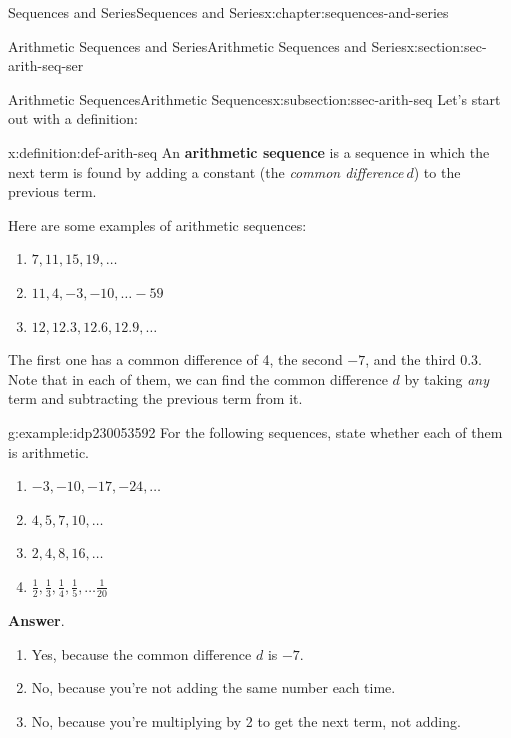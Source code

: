 \documentclass[twoside,10pt,]{book}
\newcommand{\blocktitlefont}{\relax}
\newcommand{\terminology}[1]{\textbf{#1}}
\numberwithin{equation}{section}
\begin{document}
\begin{chapterptx}{Sequences and Series}{}{Sequences and Series}{}{}{x:chapter:sequences-and-series}
\begin{sectionptx}{Arithmetic Sequences and Series}{}{Arithmetic Sequences and Series}{}{}{x:section:sec-arith-seq-ser}
%
%
\typeout{************************************************}
\typeout{************************************************}
%
\begin{subsectionptx}{Arithmetic Sequences}{}{Arithmetic Sequences}{}{}{x:subsection:ssec-arith-seq}
Let's start out with a definition: \begin{definition}{}{x:definition:def-arith-seq}%
An \terminology{arithmetic sequence} is a sequence in which the next term is found by adding a constant (the \emph{common difference}\(\ d\)) to the previous term.\end{definition}
%
\par
Here are some examples of arithmetic sequences:%
\begin{enumerate}[label=(\alph*)]
\item{}\(\displaystyle 7, 11, 15, 19, \ldots \)%
\item{}\(\displaystyle 11, 4, -3, -10, \ldots -59\)%
\item{}\(\displaystyle 12, 12.3, 12.6, 12.9, \ldots\)%
\end{enumerate}
The first one has a common difference of 4, the second \(-7\), and the third 0.3.  Note that in each of them, we can find the common difference \(d\) by taking \emph{any} term and subtracting the previous term from it. \begin{example}{}{g:example:idp230053592}%
For the following sequences, state whether each of them is arithmetic. %
\begin{enumerate}[label=(\alph*)]
\item{}\(\displaystyle -3, -10, -17, -24, \ldots\)%
\item{}\(\displaystyle 4, 5, 7, 10, \ldots\)%
\item{}\(\displaystyle 2, 4, 8, 16, \ldots\)%
\item{}\(\displaystyle \frac{1}{2},\frac{1}{3},\frac{1}{4},\frac{1}{5},\ldots \frac{1}{20}\)%
\end{enumerate}
\par\smallskip%
\noindent\textbf{\blocktitlefont Answer}.\label{g:answer:idp230053464}{}\hypertarget{g:answer:idp230053464}{}\quad{}%
\begin{enumerate}[label=(\alph*)]
\item{}Yes, because the common difference \(d\) is \(-7\).%
\item{}No, because you're not adding the same number each time.%
\item{}No, because you're multiplying by 2 to get the next term, not adding.%

\end{enumerate}
\end{example}
\end{subsectionptx}
\end{sectionptx}
\end{chapterptx}
\end{document}
